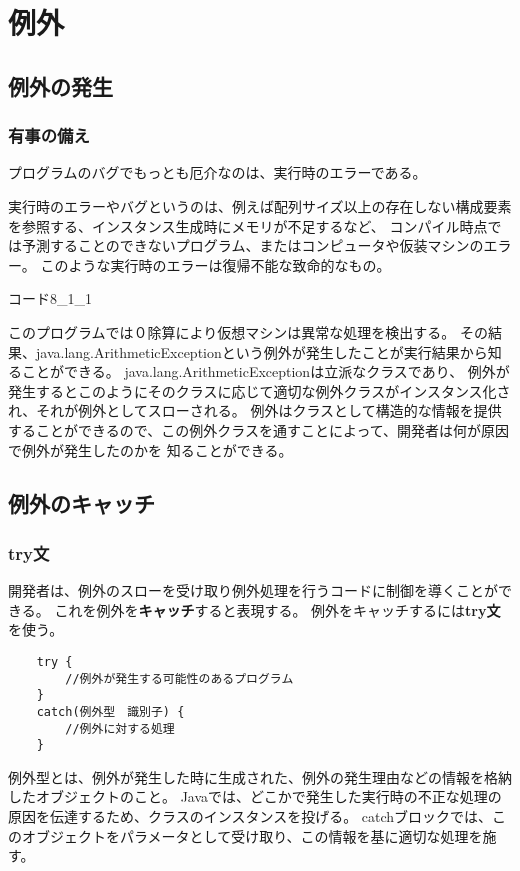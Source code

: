 \documentclass[12pt,a4j,twoside]{jsbook}
\begin{document}
\chapter{例外}
\section{例外の発生}
\subsection{有事の備え}
プログラムのバグでもっとも厄介なのは、実行時のエラーである。

実行時のエラーやバグというのは、例えば配列サイズ以上の存在しない構成要素を参照する、インスタンス生成時にメモリが不足するなど、
コンパイル時点では予測することのできないプログラム、またはコンピュータや仮装マシンのエラー。
このような実行時のエラーは復帰不能な致命的なもの。

コード8\_1\_1

このプログラムでは０除算により仮想マシンは異常な処理を検出する。
その結果、java.lang.ArithmeticExceptionという例外が発生したことが実行結果から知ることができる。
java.lang.ArithmeticExceptionは立派なクラスであり、
例外が発生するとこのようにそのクラスに応じて適切な例外クラスがインスタンス化され、それが例外としてスローされる。
例外はクラスとして構造的な情報を提供することができるので、この例外クラスを通すことによって、開発者は何が原因で例外が発生したのかを
知ることができる。
\section{例外のキャッチ}
\subsection{try文}
開発者は、例外のスローを受け取り例外処理を行うコードに制御を導くことができる。
これを例外を\textbf{キャッチ}すると表現する。
例外をキャッチするには\textbf{try文}を使う。

\begin{lstlisting}
    try {
        //例外が発生する可能性のあるプログラム
    }　
    catch(例外型　識別子) {
        //例外に対する処理
    }
\end{lstlisting}
例外型とは、例外が発生した時に生成された、例外の発生理由などの情報を格納したオブジェクトのこと。
Javaでは、どこかで発生した実行時の不正な処理の原因を伝達するため、クラスのインスタンスを投げる。
catchブロックでは、このオブジェクトをパラメータとして受け取り、この情報を基に適切な処理を施す。
\end{document}
